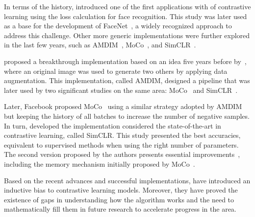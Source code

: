 \documentclass[12pt]{article}
\begin{document}
In terms of the history, \citet{chopra2005} introduced one of the first applications with  of contrastive learning using the loss calculation for face recognition. This study was later used as a base for the development of FaceNet~\citep{schroff2015}, a widely recognized approach to address this challenge. Other more generic implementations were further explored in the last few years, such as AMDIM~\citep{bachman2019}, MoCo~\citep{he2020}, and SimCLR~\citep{chen2020}.

\citet{bachman2019} proposed a breakthrough implementation based on an idea five years before by~\citet{dosovitskiy2016}, where an original image was used to generate two others by applying data augmentation. This implementation, called AMDIM, designed a pipeline that was later used by two significant studies on the same area: MoCo~\citep{he2020} and SimCLR~\citep{chen2020}.

Later, Facebook proposed MoCo~\citep{he2020} using a similar strategy adopted by AMDIM but keeping the history of all batches to increase the number of negative samples.
In turn, \citet{chen2020} developed the implementation considered the state-of-the-art in contrastive learning, called SimCLR. This study presented the best accuracies, equivalent to supervised methods when using the right number of parameters. The second version proposed by the authors presents essential improvements~\citep{chen2020.2}, including the memory mechanism initially proposed by MoCo~\citep{he2020}.

Based on the recent advances and successful implementations, \citet{saunshi2022} have introduced an inductive bias to contrastive learning models. Moreover, they have proved the existence of gaps in understanding how the algorithm works and the need to mathematically fill them in future research to accelerate progress in the area.


\end{document}
